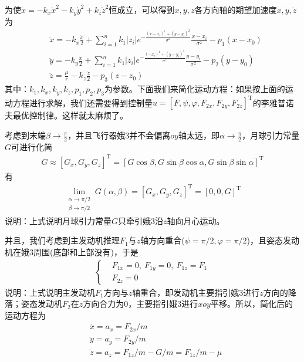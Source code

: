             为使$\dot{x} = -k_x\dot{x}^2-k_y\dot{y}^2+k_z\dot{z}^2$恒成立，可以得到$x,y,z$各方向轴的期望加速度$\ddot{x},\ddot{y},\ddot{z}$为
            \begin{align*}
            & \ddot{x} = -k_x \frac{\dot{x}}{2}+\sum_{i=1}^nk_1|z_i|e^{-\frac{(x-x_i)^1+(y-y_i)^2}{\sigma^2}} \frac{x-x_i}{\sigma^2} - p_1(x-x_0)\\
            & \ddot{y} = -k_y \frac{\dot{x}}{2}+\sum_{i=1}^nk_1|z_i|e^{-\frac{(-x_i)^1+(y-y_i)^2}{\sigma^2}} \frac{y-y_i}{\sigma^2} - p_2(y-y_0)\\
            & \ddot{z} = \frac{\mu}{r} - k_z\frac{\dot{z}}{2}- p_3(z-z_0)
            \end{align*}
            其中：$k_1,k_x,k_y,k_z,p_1,p_2,p_3$为参数。下面我们来简化运动方程：如果按上面的运动方程进行求解，我们还需要得到控制量$u = [F,\psi,\varphi,F_{2x},F_{2y},F_{2z}]^\mathrm{T}$的李雅普诺夫最优控制律。这样就太麻烦了。
            \par
            考虑到末端$\beta\to \frac{\pi}{2}$，并且飞行器娥3并不会偏离$oy$轴太远，即$\alpha\to \frac{\pi}{2}$，月球引力常量$G$可进行化简
            \begin{align*}
            G \approx [G_x,G_y,G_z]^\mathrm{T} = [G\cos\beta,G\sin\beta\cos\alpha,G\sin\beta\sin\alpha]^\mathrm{T}
            \end{align*}
            有
            \begin{align*}
            \lim_{\substack{\alpha\to \pi/2\\\beta\to \pi/2}} G(\alpha,\beta) = [G_x,G_y,G_z]^\mathrm{T} = [0,0,G]^\mathrm{T}
            \end{align*}
            说明：上式说明月球引力常量$G$只牵引娥3沿$z$轴向月心运动。
            \par
            并且，我们考虑到主发动机推理$F_1$与$z$轴方向重合($\psi=\pi/2,\varphi=\pi/2$)，且姿态发动机在娥3周围(底部和上部没有)，于是
            \begin{align*}
            \left\{
            \begin{aligned}
            & F_{1x} = 0,\ F_{1y} = 0,\ F_{1z} = F_1\\
            & F_{2z} = 0
            \end{aligned}
            \right.
            \end{align*}
            说明：上式说明主发动机$F_1$方向与$z$轴重合，即发动机主要指引娥3进行$z$方向的降落；姿态发动机$F_2$在$z$方向合力为0，主要指引娥3进行$xoy$平移。所以，简化后的运动方程为
            \begin{align*}
            & \ddot{x} = a_x = F_{2x}/m\\
            & \ddot{y} = a_y = F_{2y}/m\\
            & \ddot{z} = a_z = F_{1z}/m - G/m = F_{1z}/m - \mu
            \end{align*}
